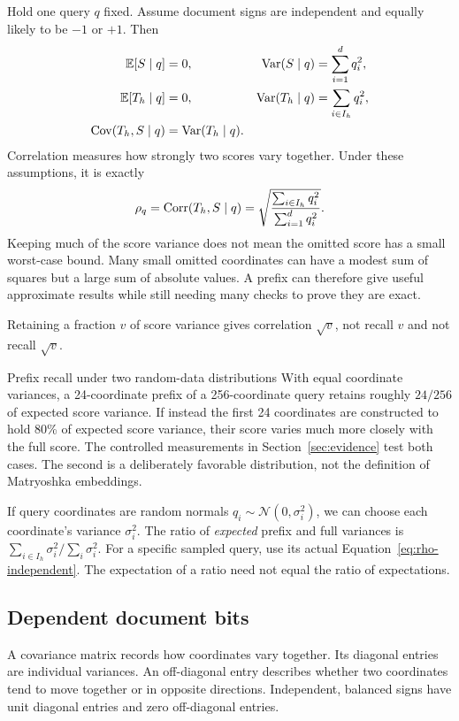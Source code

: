 Hold one query $q$ fixed. Assume document signs are independent and equally
likely to be $-1$ or $+1$. Then
\begin{align}
\mathbb E[S\mid q]&=0,&\operatorname{Var}(S\mid q)&=\sum_{i=1}^{d}q_i^2,\\
\mathbb E[T_h\mid q]&=0,&\operatorname{Var}(T_h\mid q)&=\sum_{i\in I_h}q_i^2,\\
\operatorname{Cov}(T_h,S\mid q)&=\operatorname{Var}(T_h\mid q).&&
\end{align}
Correlation measures how strongly two scores vary together. Under these assumptions, it is exactly
\begin{equation}
\rho_q=\operatorname{Corr}(T_h,S\mid q)=
\sqrt{\frac{\sum_{i\in I_h}q_i^2}{\sum_{i=1}^{d}q_i^2}}.
\label{eq:rho-independent}
\end{equation}
Keeping much of the score variance does not mean the omitted score has a small worst-case bound. Many small omitted coordinates can have a modest sum of squares but a large sum of absolute values. A prefix can therefore give useful approximate results while still needing many checks to prove they are exact.

Retaining a fraction $v$ of score variance gives correlation
$\sqrt v$, not recall $v$ and not recall $\sqrt v$.

\begin{examplebox}{Prefix recall under two random-data distributions}
With equal coordinate variances, a 24-coordinate prefix of a 256-coordinate query retains
roughly $24/256$ of expected score variance. If instead the first 24 coordinates are constructed
to hold 80\% of expected score variance, their score varies much more closely with the
full score. The controlled measurements in Section~\ref{sec:evidence} test both cases. The
second is a deliberately favorable distribution, not the definition of Matryoshka embeddings.
\end{examplebox}

If query coordinates are random normals $q_i\sim\mathcal N(0,\sigma_i^2)$, we can choose each coordinate's variance $\sigma_i^2$. The ratio of \emph{expected} prefix and full variances is
$\sum_{i\in I_h}\sigma_i^2/\sum_i\sigma_i^2$. For a specific sampled query, use its actual
Equation~\eqref{eq:rho-independent}. The expectation of a ratio need not equal the ratio of
expectations.

\subsection{Dependent document bits}
A covariance matrix records how coordinates vary together. Its diagonal entries are individual variances. An off-diagonal entry describes whether two coordinates tend to move together or in opposite directions. Independent, balanced signs have unit diagonal entries and zero off-diagonal entries.

